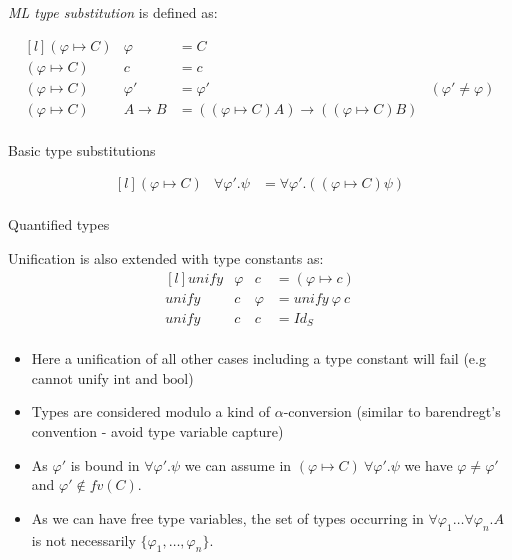 \textit{ML type substitution} is defined as:
\\ \begin{minipage}[b]{.5\textwidth}
    \[\begin{matrix*}[l]
        (\varphi \mapsto C) & \varphi & = C \\
        (\varphi \mapsto C) & c & = c \\
        (\varphi \mapsto C) & \varphi' & = \varphi' & (\varphi' \neq \varphi) \\
        (\varphi \mapsto C) & A \to B & = ((\varphi \mapsto C) A) \to ((\varphi \mapsto C) B) \\
    \end{matrix*}\]
    \centerline{Basic type substitutions}
\end{minipage}
\begin{minipage}[b]{.5\textwidth}
    \[\begin{matrix*}[l]
        (\varphi \mapsto C) & \forall \varphi' . \psi & = \forall \varphi' .((\varphi \mapsto C) \psi) \\
    \end{matrix*}\]
    \centerline{Quantified types}
\end{minipage}
\vspace{2mm}
Unification is also extended with type constants as:
\[\begin{matrix*}[l]
    unify & \varphi & c & = (\varphi \mapsto c) \\
    unify & c & \varphi & = unify \ \varphi \ c \\
    unify & c & c & = Id_S \\
\end{matrix*}\]
\begin{itemize}
    \item Here a unification of all other cases including a type constant will fail (e.g cannot unify $\text{int}$ and $\text{bool}$)
    \item Types are considered modulo a kind of $\alpha$-conversion (similar to barendregt's convention - avoid type variable capture)
    \item As $\varphi'$ is bound in $\forall \varphi' . \psi$ we can assume in $(\varphi \mapsto C) \ \forall \varphi' . \psi$ we have $\varphi \neq \varphi'$ and $\varphi' \not\in fv(C)$.
    \item As we can have free type variables, the set of types occurring in $\forall \varphi_1 \dots \forall \varphi_n . A$ is not necessarily $\{\varphi_1, \dots , \varphi_n\}$.
\end{itemize}
